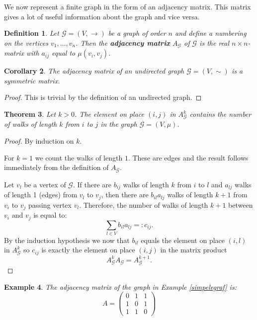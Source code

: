 \documentclass[a4paper,11pt]{report}
\newtheorem{theorem}{Theorem}[section]
\newtheorem{example}[theorem]{Example}
\newtheorem{definition}[theorem]{Definition}
\newtheorem{corollary}[theorem]{Corollary}
\newcommand{\graf}{\mathscr{G}}
\begin{document}
 We now represent a finite graph in the form of an adjacency matrix. This 
 matrix gives a lot of useful information about the graph and vice versa.
 
 
 \begin{definition}
 Let $\graf=(V, \to)$ be a graph of order $n$ and define a numbering on the 
 vertices $v_1,\ldots, v_n$. Then the \textbf{adjacency matrix} $A_\graf$ of $\graf$ is the real
 $n\times n$-matrix with $a_{ij}$ equal to $\mu(v_i, v_j)$.
 \end{definition}
 
 \begin{corollary}
   The adjacency matrix of an undirected graph $\graf=(V, \sim)$ is a symmetric 
   matrix.
 \end{corollary}
 
 \begin{proof}
   This is trivial by the definition of an undirected graph.
 \end{proof}
\begin{theorem}\label{numberwalks}
  Let $k > 0$. The element on place $(i,j)$ in $A^k_\graf$ contains the number 
  of walks of length $k$ from $i$ to $j$ in the graph $\graf = (V, \mu)$.
\end{theorem}
 \begin{proof}
   By induction on $k$. 
   
   For $k = 1$ we count the walks of length $1$. These are edges and the 
   result follows immediately from the definition of $A_\graf$.
   
  Let $v_l$ be a vertex of $\graf$. If there are $b_{ij}$ walks of length $k$ 
  from $i$ to $l$ and $a_{lj}$ walks of length 1 (edges) from $v_l$ to $v_j$, 
  then there are $b_{il}a_{lj}$ walks of length $k+1$ from $v_i$ to $v_j$ passing vertex 
  $v_l$. Therefore, the number of walks of length $k+1$ between $v_i$ and $v_j$ 
  is equal to:
  $$\sum_{l\in V} b_{il}a_{lj} =: c_{ij}.$$
By the induction hypothesis we now that $b_{il}$ equals  the element on place $(i,l)$ 
in $A^k_\graf$ so $c_{ij}$ is exactly the element on place $(i,j)$ in the matrix 
product
$$A^k_\graf A_\graf = A^{k+1}_\graf.$$
 \end{proof}
 \begin{example}
The adjacency matrix of the graph in Example \ref{simpelegraf} is:
$$A = \begin{pmatrix}
0 & 1 & 1\\
1 & 0 & 1\\
1 & 1 & 0
\end{pmatrix}$$


\end{example}
\end{document}
